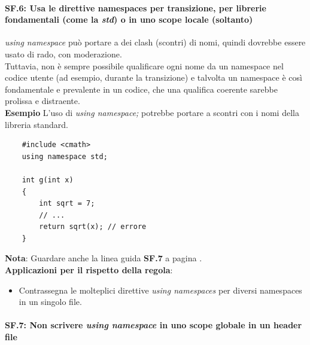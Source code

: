 \paragraph{SF.6: Usa le direttive namespaces per transizione, per librerie fondamentali (come la \emph{std}) o in uno scope locale (soltanto)}

\textsf{\small \emph{using namespace} può portare a dei clash (scontri) di nomi, quindi dovrebbe essere usato di rado, con moderazione. } \\

\textsf{\small Tuttavia, non è sempre possibile qualificare ogni nome da un namespace nel codice utente (ad esempio, durante la transizione) e talvolta un namespace è così fondamentale e prevalente in un codice, che una qualifica coerente sarebbe prolissa e distraente.} \\

\textsf{\small \textbf{Esempio} L'uso di \emph{using namespace;} potrebbe portare a scontri con i nomi della libreria standard.} \\

\begin{lstlisting}
	#include <cmath>
	using namespace std;
	
	int g(int x)
	{
		int sqrt = 7;
		// ...
		return sqrt(x); // errore
	}
\end{lstlisting}


\textsf{\small \textbf{Nota}: Guardare anche la linea guida \textbf{SF.7} a pagina \pageref{SF_7}.} \\

\textsf{\small \textbf{Applicazioni per il rispetto della regola}: }

\begin{itemize}
	\item \textsf{\small Contrassegna le molteplici direttive \emph{using namespaces} per diversi namespaces in un singolo file.}
\end{itemize}

\paragraph{SF.7: Non scrivere \emph{using namespace} in uno scope globale in un header file}

\label{SF_7}

